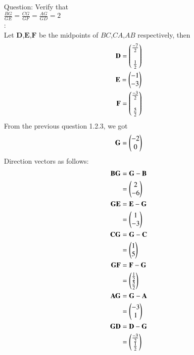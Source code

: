\documentclass[journal,12pt,onecolumn]{IEEEtran}
\theoremstyle{remark}
\begin{document}
\let\vec\mathbf




\vspace{3cm}



\bigskip

\renewcommand{\thefigure}{\theenumi}
\renewcommand{\thetable}{\theenumi}
Question: Verify that\\
$\frac{BG}{GE}=\frac{CG}{GF}=\frac{AG}{GD}=2$\\
\solution:\\
Let $\vec{D}$,$\vec{E}$,$\vec{F}$ be the midpoints of $BC$,$CA$,$AB$ respectively, then
\begin{align}
\vec{D} = \myvec{\frac{-7}{2}\\\\\frac{1}{2}}\\
\vec{E} = \myvec{-1\\-3}\\
\vec{F} = \myvec{\frac{-3}{2}\\\\\frac{5}{2}}
\end{align}
From the previous question 1.2.3, we got
\begin{align}
\vec{G}=\myvec{-2\\0}
\end{align}
Direction vectors as follows: \\
\begin{align}
\vec{B}\vec{G}&=\vec{G}-\vec{B}\\
              &=\myvec{2\\-6}\\
\vec{G}\vec{E}&=\vec{E}-\vec{G}\\
              &=\myvec{1\\-3}\\
\vec{C}\vec{G}&=\vec{G}-\vec{C}\\
              &=\myvec{1\\5}\\
\vec{G}\vec{F}&=\vec{F}-\vec{G}\\
              &=\myvec{\frac{1}{2}\\\frac{5}{2}}\\
\vec{A}\vec{G}&=\vec{G}-\vec{A}\\
              &=\myvec{-3\\1}\\
\vec{G}\vec{D}&=\vec{D}-\vec{G}\\
              &=\myvec{\frac{-3}{2}\\\frac{1}{2}}
\end{align}
\end{document}
